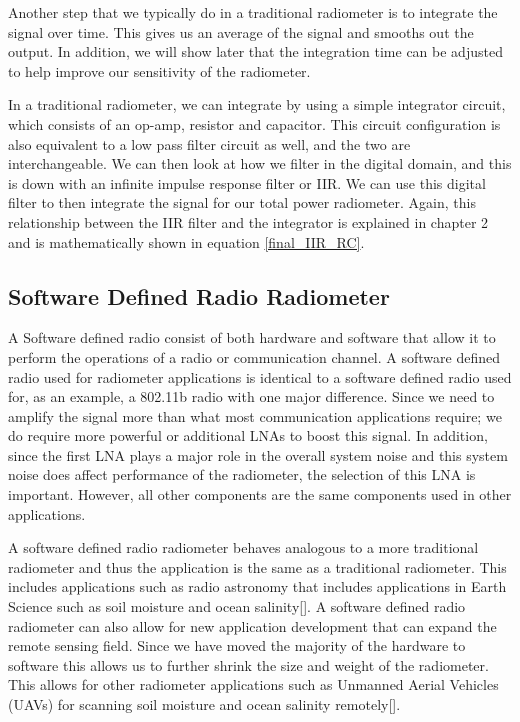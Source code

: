 Another step that we typically do in a traditional radiometer is to integrate the signal over time.  This gives us an average of the signal and smooths out the output.  In addition, we will show later that the integration time can be adjusted to help improve our sensitivity of the radiometer.

In a traditional radiometer, we can integrate by using a simple integrator circuit, which consists of an op-amp, resistor and capacitor.  This circuit configuration is also equivalent to a low pass filter circuit as well, and the two are interchangeable.  We can then look at how we filter in the digital domain, and this is down with an infinite impulse response filter or IIR.  We can use this digital filter to then integrate the signal for our total power radiometer. Again, this relationship between the IIR filter and the integrator is explained in chapter 2 and is mathematically shown in equation \ref{final_IIR_RC}.


\subsection{Software Defined Radio Radiometer}

A Software defined radio consist of both hardware and software that allow it to perform the operations of a radio or communication channel.  A software defined radio used for radiometer applications is identical to a software defined radio used for, as an example, a 802.11b radio with one major difference.  Since we need to amplify the signal more than what most communication applications require; we do require more powerful or additional LNAs to boost this signal.  In addition, since the first LNA plays a major role in the overall system noise and this system noise does affect performance of the radiometer, the selection of this LNA is important.  However, all other components are the same components used in other applications.

A software defined radio radiometer behaves analogous to a more traditional radiometer and thus the application is the same as a traditional radiometer.  This includes applications such as radio astronomy that includes applications in Earth Science such as soil moisture and ocean salinity[\cite{Ruf}].  A software defined radio radiometer can also allow for new application development that can expand the remote sensing field.  Since we have moved the majority of the hardware to software this allows us to further shrink the size and weight of the radiometer.  This allows for other radiometer applications such as Unmanned Aerial Vehicles (UAVs) for scanning soil moisture and ocean salinity remotely[\cite{McIntyre}].  

